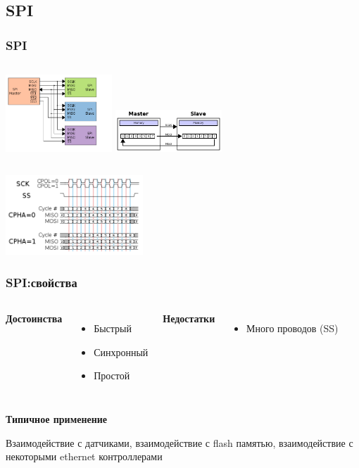 \subsection{SPI}
\begin{frame}
  \frametitle{SPI}
  \begin{columns}
    \column{4cm}
    \includegraphics[width=4cm]{./slides/hardware_protocols/SPI_three_slaves.png}
    \column{4cm}
    \includegraphics[width=4cm]{./slides/hardware_protocols/SPI_8-bit_circular_transfer.png}
  \end{columns}
  \begin{center}
    \includegraphics[height=3cm]{./slides/hardware_protocols/SPI_timing_diagram2.png}
  \end{center}
\end{frame}

\begin{frame}
  \frametitle{SPI:свойства}
  \begin{columns}
    \column{4cm}
    \begin{center}
      {\bf\large Достоинства}
    \end{center}
    \begin{itemize}
       \item Быстрый
       \item Синхронный
       \item Простой
    \end{itemize}
    \column{4cm}
    \begin{center}
      {\bf\large Недостатки}
    \end{center}
    \begin{itemize}
       \item Много проводов (SS)
    \end{itemize}
  \end{columns}
  \begin{center}
    {\bf\large Типичное применение}
  \end{center}
  Взаимодействие с датчиками, взаимодействие с flash памятью, взаимодействие с некоторыми ethernet контроллерами
\end{frame}
